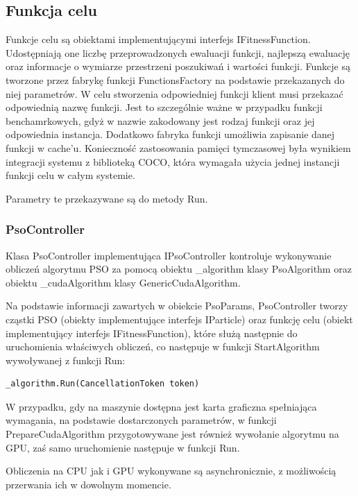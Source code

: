 \documentclass[12pt, twoside, openany, abstract=on]{report}
\theoremstyle{definition}
\begin{document}
\subsection{Funkcja celu}
Funkcje celu są obiektami implementującymi interfejs IFitnessFunction. Udostępniają one liczbę przeprowadzonych ewaluacji funkcji, najlepszą ewaluację oraz informacje o wymiarze przestrzeni poszukiwań i wartości funkcji. Funkcje są tworzone przez fabrykę funkcji FunctionsFactory na podstawie przekazanych do niej parametrów. W celu stworzenia odpowiedniej funkcji klient musi przekazać odpowiednią nazwę funkcji. Jest to szczególnie ważne w przypadku funkcji benchamrkowych, gdyż w nazwie zakodowany jest rodzaj funkcji oraz jej odpowiednia instancja. Dodatkowo fabryka funkcji umożliwia zapisanie danej funkcji w cache'u. Konieczność zastosowania pamięci tymczasowej była wynikiem integracji systemu z biblioteką COCO, która wymagała użycia jednej instancji funkcji celu w całym systemie.

Parametry te przekazywane są do metody Run.

\subsubsection{PsoController}
Klasa PsoController implementująca IPsoController kontroluje wykonywanie obliczeń algorytmu PSO za pomocą obiektu \_algorithm klasy PsoAlgorithm oraz obiektu \_cudaAlgorithm klasy GenericCudaAlgorithm. 

Na podstawie informacji zawartych w obiekcie PsoParams, PsoController tworzy cząstki PSO (obiekty implementujące interfejs IParticle) oraz funkcję celu (obiekt implementujący interfejs IFitnessFunction), które służą następnie do uruchomienia właściwych obliczeń, co następuje w funkcji StartAlgorithm wywoływanej z funkcji Run:

\begin{lstlisting}[frame=single]
_algorithm.Run(CancellationToken token)
\end{lstlisting}

W przypadku, gdy na maszynie dostępna jest karta graficzna spełniająca wymagania, na podstawie dostarczonych parametrów, w funkcji PrepareCudaAlgorithm przygotowywane jest również wywołanie algorytmu na GPU, zaś samo uruchomienie następuje w funkcji Run.

Obliczenia na CPU jak i GPU wykonywane są asynchronicznie, z możliwością przerwania ich w dowolnym momencie.

\end{document}
